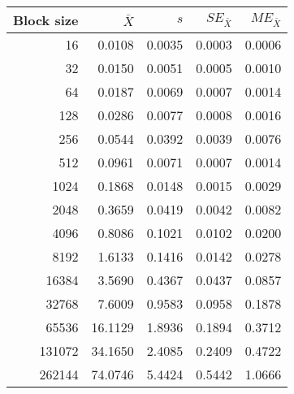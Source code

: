 \begin{tabular}{rrrrr}\toprule
{\small Block size} & $\bar{X}$ & $s$ & $SE_{\bar{X}}$ & $ME_{\bar{X}}$ \\\midrule
16 & 0.0108 & 0.0035 & 0.0003 & 0.0006\\
32 & 0.0150 & 0.0051 & 0.0005 & 0.0010\\
64 & 0.0187 & 0.0069 & 0.0007 & 0.0014\\
128 & 0.0286 & 0.0077 & 0.0008 & 0.0016\\
256 & 0.0544 & 0.0392 & 0.0039 & 0.0076\\
512 & 0.0961 & 0.0071 & 0.0007 & 0.0014\\
1024 & 0.1868 & 0.0148 & 0.0015 & 0.0029\\
2048 & 0.3659 & 0.0419 & 0.0042 & 0.0082\\
4096 & 0.8086 & 0.1021 & 0.0102 & 0.0200\\
8192 & 1.6133 & 0.1416 & 0.0142 & 0.0278\\
16384 & 3.5690 & 0.4367 & 0.0437 & 0.0857\\
32768 & 7.6009 & 0.9583 & 0.0958 & 0.1878\\
65536 & 16.1129 & 1.8936 & 0.1894 & 0.3712\\
131072 & 34.1650 & 2.4085 & 0.2409 & 0.4722\\
262144 & 74.0746 & 5.4424 & 0.5442 & 1.0666\\
\bottomrule
\end{tabular}
